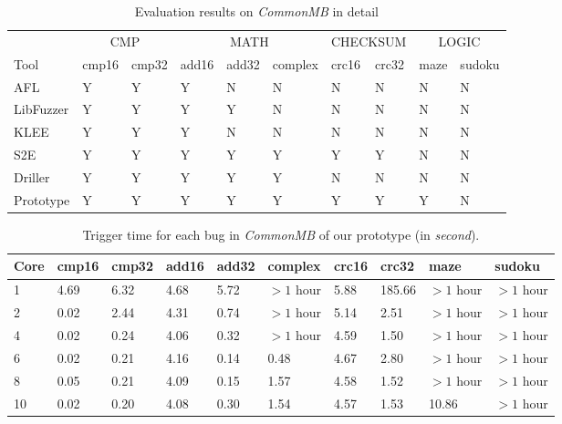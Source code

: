 \begin{table}
  \caption{\label{CommonMB-results-detail}Evaluation results on \textit{CommonMB} in detail}
  \centering
	\begin{tabular}{p{2cm}<{\centering} p{1cm}<{\centering} p{1cm}<{\centering} | p{1cm}<{\centering}
	p{1cm}<{\centering} p{1.2cm}<{\centering} | p{1cm}<{\centering} p{1cm}<{\centering} | p{1cm}<{\centering} p{1cm}<{\centering}}
		\toprule
	& \multicolumn{2}{c}{CMP}  & \multicolumn{3}{c}{MATH} & \multicolumn{2}{c}{CHECKSUM} & 	\multicolumn{2}{c}{LOGIC} \\ 
	    Tool & cmp16 & cmp32 & add16 & add32 & complex & crc16 & crc32 & maze & sudoku \\
		\midrule
		AFL 		& Y & Y & Y & N & N & N & N & N & N \\
		LibFuzzer	& Y & Y & Y & Y & N & N & N & N & N \\
		KLEE		& Y & Y & Y & N & N & N & N & N & N \\
		S2E			& Y & Y & Y & Y & Y & Y & Y & N & N \\
		Driller		& Y & Y & Y & Y & Y & N & N & N & N \\
		Prototype	& Y & Y & Y & Y & Y & Y & Y & Y & N \\
	 \bottomrule
	\end{tabular}
\end{table}
\begin{table}
\centering
  \caption{\label{Prototype-result-CommonMB}Trigger time for each bug in \textit{CommonMB}  of our prototype (in \textit{second}).}
 	\begin{tabular}{p{0.5cm}<{\centering} p{1cm}<{\centering} p{1cm}<{\centering} p{1cm}<{\centering}	p{1cm}<{\centering} p{1.5cm}<{\centering}  p{1cm}<{\centering} p{1cm}<{\centering}  p{1.5cm}<{\centering} p{1.5cm}<{\centering}}
		\toprule
	    Core & cmp16 & cmp32 & add16 & add32 & complex & crc16 & crc32 & maze & sudoku \\
		\midrule
		1 	& 4.69 & 6.32 & 4.68 & 5.72 & $>1$ hour & 5.88 & 185.66 & $>1$ hour & $>1$ hour \\
		2	& 0.02 & 2.44 & 4.31 & 0.74 & $>1$ hour & 5.14 & 2.51   & $>1$ hour & $>1$ hour \\
		4	& 0.02 & 0.24 & 4.06 & 0.32 & $>1$ hour & 4.59 & 1.50   & $>1$ hour & $>1$ hour \\
		6	& 0.02 & 0.21 & 4.16 & 0.14 & 0.48 	    & 4.67 & 2.80   & $>1$ hour & $>1$ hour \\
		8	& 0.05 & 0.21 & 4.09 & 0.15 & 1.57      & 4.58 & 1.52   & $>1$ hour & $>1$ hour \\
		10	& 0.02 & 0.20 & 4.08 & 0.30 & 1.54      & 4.57 & 1.53   & 10.86     & $>1$ hour \\
	 \bottomrule
	\end{tabular}
\end{table}



